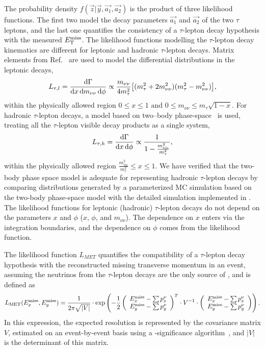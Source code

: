 \documentclass[11pt,twoside,a4paper,cmspaper,final,collab]{cms-tdr}
\begin{document}
The probability density $f(\vec{z} \vert \vec{y}, \vec{a_1}, \vec{a_2})$ is the product of three likelihood functions.
The first two model the decay parameters $\vec{a_1}$ and $\vec{a_2}$
of the two $\tau$ leptons, and the last
one quantifies the consistency of a $\tau$-lepton decay hypothesis with the measured $E_{\mathrm{T}}^{\text{miss}}$.
The likelihood functions modelling the $\tau$-lepton decay kinematics are different for leptonic and hadronic $\tau$-lepton decays.
Matrix elements from Ref.~\cite{TauPol} are used to model the differential distributions in the leptonic
decays,
\begin{equation}
L_{\tau,l} = \frac{\mathrm{d}\Gamma}{\mathrm{d} x\, \mathrm{d} m_{\nu\nu}\,\mathrm{d}\phi} \propto \frac{m_{\nu\nu}}{4m_{\tau}^2} \big[(m_{\tau}^2 +2m_{\nu\nu}^2 )(m_{\tau}^2 - m_{\nu\nu}^2)\big],
\label{eq:likelihoodLepTauDecay}
\end{equation}
within the physically allowed region $0 \leq x \leq 1 \mbox{ and } 0 \leq m_{\nu\nu} \leq m_{\tau}\sqrt{1-x}$.
For hadronic $\tau$-lepton decays, a model based on two--body phase-space~\cite{PDG} is used,
treating all the $\tau$-lepton visible decay products as a single system,
\begin{equation}
L_{\tau,h} = \frac{\mathrm{d}\Gamma}{\mathrm{d} x\,\mathrm{d}\phi} \propto \frac{1}{1- \frac{m^2_\text{vis}}{m^2_{\tau}}},
\label{eq:likelihoodHadTauDecay}
\end{equation}
within the physically allowed region $\frac{m_\text{vis}^{2}}{m_{\tau}^{2}} \leq x \leq 1$.
We have verified that the two-body phase space model is adequate for representing hadronic $\tau$-lepton decays
by comparing distributions generated by a parameterized MC simulation based on the two-body phase-space model
with the detailed simulation implemented in \TAUOLA.
The likelihood functions for leptonic (hadronic) $\tau$-lepton decays do not depend on the parameters $x$ and $\phi$ ($x$, $\phi$, and $m_{\nu\nu}$). The dependence on $x$ enters via the integration boundaries, and the dependence on $\phi$ comes from the \MET likelihood function.

The \MET likelihood function $L_{MET}$ quantifies the compatibility of a $\tau$-lepton decay hypothesis
with the reconstructed missing transverse momentum in an event,
assuming the neutrinos from the $\tau$-lepton decays are the only source of \MET, and is defined as
\begin{equation}
L_{\rm MET} (E_{x}^\text{miss}, E_{y}^\text{miss}) = \frac{1}{2 \pi \sqrt{\vert V \vert}}
\cdot \exp \left( -\frac{1}{2}
 \left( \begin{array}{c} E_{x}^\text{miss} - \sum p_{x}^{\nu} \\ E_{y}^\text{miss} - \sum p_{y}^{\nu} \end{array} \right)^{T}
\cdot V^{-1} \cdot
 \left( \begin{array}{c} E_{x}^\text{miss} - \sum p_{x}^{\nu} \\ E_{y}^\text{miss} - \sum p_{y}^{\nu} \end{array} \right)
\right).
\end{equation}
In this expression, the expected \MET resolution is represented by the covariance matrix $V$, estimated on an event-by-event basis using a
\MET-significance algorithm~\cite{PFMEtSignAlgo},
and $\vert V \vert$ is the determinant of this matrix.
\end{document}
